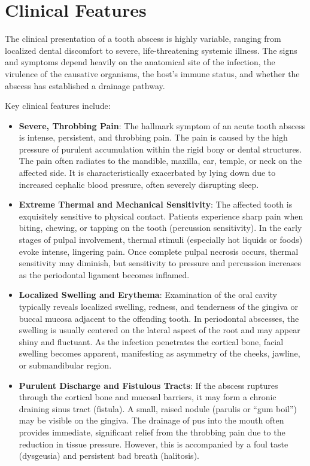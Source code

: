 \section*{Clinical Features}
The clinical presentation of a tooth abscess is highly variable, ranging from localized dental discomfort to severe, life-threatening systemic illness. The signs and symptoms depend heavily on the anatomical site of the infection, the virulence of the causative organisms, the host's immune status, and whether the abscess has established a drainage pathway.

Key clinical features include:
\begin{itemize}
  \item \textbf{Severe, Throbbing Pain}: The hallmark symptom of an acute tooth abscess is intense, persistent, and throbbing pain. The pain is caused by the high pressure of purulent accumulation within the rigid bony or dental structures. The pain often radiates to the mandible, maxilla, ear, temple, or neck on the affected side. It is characteristically exacerbated by lying down due to increased cephalic blood pressure, often severely disrupting sleep.
  \item \textbf{Extreme Thermal and Mechanical Sensitivity}: The affected tooth is exquisitely sensitive to physical contact. Patients experience sharp pain when biting, chewing, or tapping on the tooth (percussion sensitivity). In the early stages of pulpal involvement, thermal stimuli (especially hot liquids or foods) evoke intense, lingering pain. Once complete pulpal necrosis occurs, thermal sensitivity may diminish, but sensitivity to pressure and percussion increases as the periodontal ligament becomes inflamed.
  \item \textbf{Localized Swelling and Erythema}: Examination of the oral cavity typically reveals localized swelling, redness, and tenderness of the gingiva or buccal mucosa adjacent to the offending tooth. In periodontal abscesses, the swelling is usually centered on the lateral aspect of the root and may appear shiny and fluctuant. As the infection penetrates the cortical bone, facial swelling becomes apparent, manifesting as asymmetry of the cheeks, jawline, or submandibular region.
  \item \textbf{Purulent Discharge and Fistulous Tracts}: If the abscess ruptures through the cortical bone and mucosal barriers, it may form a chronic draining sinus tract (fistula). A small, raised nodule (parulis or ``gum boil'') may be visible on the gingiva. The drainage of pus into the mouth often provides immediate, significant relief from the throbbing pain due to the reduction in tissue pressure. However, this is accompanied by a foul taste (dysgeusia) and persistent bad breath (halitosis).

\end{itemize}
